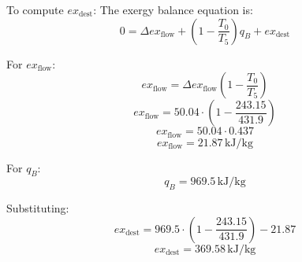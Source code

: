 To compute \( ex_{\text{dest}} \):  
The exergy balance equation is:  
\[
0 = \Delta ex_{\text{flow}} + \left( 1 - \frac{T_0}{T_5} \right) q_B + ex_{\text{dest}}
\]  

For \( ex_{\text{flow}} \):  
\[
ex_{\text{flow}} = \Delta ex_{\text{flow}} \left( 1 - \frac{T_0}{T_5} \right)
\]  
\[
ex_{\text{flow}} = 50.04 \cdot \left( 1 - \frac{243.15}{431.9} \right)
\]  
\[
ex_{\text{flow}} = 50.04 \cdot 0.437
\]  
\[
ex_{\text{flow}} = 21.87 \, \text{kJ}/\text{kg}
\]  

For \( q_B \):  
\[
q_B = 969.5 \, \text{kJ}/\text{kg}
\]  

Substituting:  
\[
ex_{\text{dest}} = 969.5 \cdot \left( 1 - \frac{243.15}{431.9} \right) - 21.87
\]  
\[
ex_{\text{dest}} = 369.58 \, \text{kJ}/\text{kg}
\]